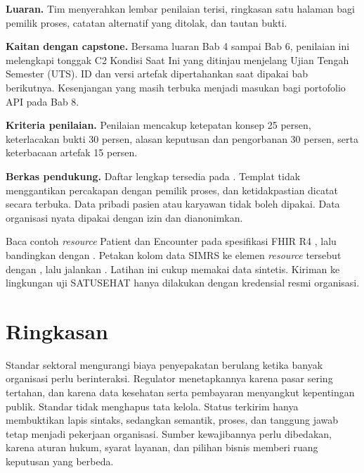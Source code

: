 \textbf{Luaran.} Tim menyerahkan lembar penilaian terisi, ringkasan satu halaman bagi pemilik proses, catatan
alternatif yang ditolak, dan tautan bukti.

\textbf{Kaitan dengan capstone.} Bersama luaran Bab 4 sampai Bab 6, penilaian ini melengkapi tonggak C2 Kondisi Saat
Ini yang ditinjau menjelang Ujian Tengah Semester (UTS). ID dan versi artefak dipertahankan saat dipakai bab
berikutnya. Kesenjangan yang masih terbuka menjadi masukan bagi portofolio API pada Bab 8.

\textbf{Kriteria penilaian.} Penilaian mencakup ketepatan konsep 25 persen, keterlacakan bukti 30 persen, alasan
keputusan dan pengorbanan 30 persen, serta keterbacaan artefak 15 persen.

\textbf{Berkas pendukung.} Daftar lengkap tersedia pada . Templat tidak
menggantikan percakapan dengan pemilik proses, dan ketidakpastian dicatat secara terbuka. Data pribadi pasien atau
karyawan tidak boleh dipakai. Data organisasi nyata dipakai dengan izin dan dianonimkan.

\begin{pendalaman}[title={Pendalaman Teknis (opsional): Memetakan Kolom SIMRS}]
Baca contoh \textit{resource} Patient dan Encounter pada spesifikasi FHIR R4
\cite{c07-fhir-patient, c07-fhir-encounter}, lalu bandingkan dengan .
Petakan kolom data SIMRS ke elemen \textit{resource} tersebut dengan
, lalu jalankan
. Latihan ini cukup memakai data sintetis. Kiriman ke
lingkungan uji SATUSEHAT hanya dilakukan dengan kredensial resmi organisasi.
\end{pendalaman}

\section{Ringkasan}

Standar sektoral mengurangi biaya penyepakatan berulang ketika banyak organisasi perlu berinteraksi. Regulator
menetapkannya karena pasar sering tertahan, dan karena data kesehatan serta pembayaran menyangkut kepentingan publik.
Standar tidak menghapus tata kelola. Status terkirim hanya membuktikan lapis sintaks, sedangkan semantik, proses, dan
tanggung jawab tetap menjadi pekerjaan organisasi. Sumber kewajibannya perlu dibedakan, karena aturan hukum, syarat
layanan, dan pilihan bisnis memberi ruang keputusan yang berbeda.

